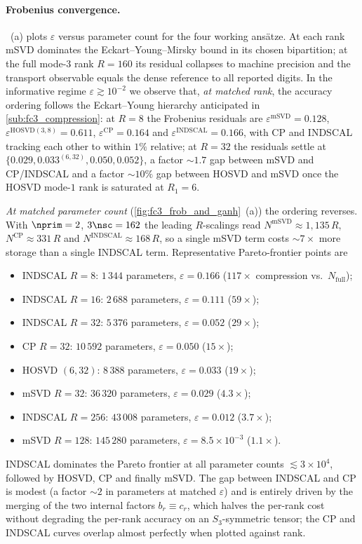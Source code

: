 \paragraph{Frobenius convergence.} ~(a) plots $\varepsilon$ versus
parameter count for the four working ans\"atze. At each rank mSVD dominates the
Eckart--Young--Mirsky bound in its chosen bipartition; at the full mode-$3$ rank $R=160$ its
residual collapses to machine precision and the transport observable equals the dense reference
to all reported digits. In the informative regime $\varepsilon\gtrsim 10^{-2}$ we observe
that, \emph{at matched rank}, the accuracy ordering follows the Eckart--Young hierarchy anticipated
in \cref{sub:fc3_compression}: at $R=8$ the Frobenius residuals are
$\varepsilon^{\mathrm{mSVD}}=0.128$, $\varepsilon^{\mathrm{HOSVD}(3,8)}=0.611$,
$\varepsilon^{\mathrm{CP}}=0.164$ and $\varepsilon^{\mathrm{INDSCAL}}=0.166$, with CP and
INDSCAL tracking each other to within $1\%$ relative; at $R=32$ the residuals settle at
$\{0.029,0.033^{(6,32)},0.050,0.052\}$, a factor $\sim 1.7$ gap between mSVD and
CP/INDSCAL and a factor $\sim 10\%$ gap between HOSVD and mSVD once the HOSVD mode-$1$ rank is
saturated at $R_1=6$.

\emph{At matched parameter count} (\cref{fig:fc3_frob_and_ganh}~(a)) the ordering reverses.
With $\nprim=2$, $3\nsc=162$ the leading $R$-scalings read
$N^{\mathrm{mSVD}}\!\approx 1{,}135\,R$, $N^{\mathrm{CP}}\!\approx 331\,R$ and
$N^{\mathrm{INDSCAL}}\!\approx 168\,R$, so a single mSVD term costs $\sim 7\times$ more storage
than a single INDSCAL term. Representative Pareto-frontier points are
\begin{itemize}\setlength{\itemsep}{1pt}
  \item INDSCAL $R=8$: $1\,344$ parameters, $\varepsilon=0.166$ ($117\times$ compression vs.\
        $N_{\mathrm{full}}$);
  \item INDSCAL $R=16$: $2\,688$ parameters, $\varepsilon=0.111$ ($59\times$);
  \item INDSCAL $R=32$: $5\,376$ parameters, $\varepsilon=0.052$ ($29\times$);
  \item CP $R=32$: $10\,592$ parameters, $\varepsilon=0.050$ ($15\times$);
  \item HOSVD $(6,32)$: $8\,388$ parameters, $\varepsilon=0.033$ ($19\times$);
  \item mSVD $R=32$: $36\,320$ parameters, $\varepsilon=0.029$ ($4.3\times$);
  \item INDSCAL $R=256$: $43\,008$ parameters, $\varepsilon=0.012$ ($3.7\times$);
  \item mSVD $R=128$: $145\,280$ parameters, $\varepsilon=8.5\times 10^{-3}$ ($1.1\times$).
\end{itemize}
INDSCAL dominates the Pareto frontier at all parameter counts $\lesssim 3\times 10^{4}$,
followed by HOSVD, CP and finally mSVD. The gap between INDSCAL and CP is modest (a factor
$\sim 2$ in parameters at matched $\varepsilon$) and is entirely driven by the merging of the
two internal factors $b_r\equiv c_r$, which halves the per-rank cost without degrading the
per-rank accuracy on an $S_3$-symmetric tensor; the CP and INDSCAL curves overlap almost
perfectly when plotted against rank.

